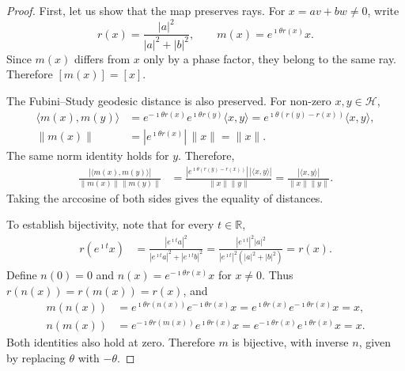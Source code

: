 \documentclass{techbrief}
\begin{document}
\begin{proof}
	First, let us show that the map preserves rays. For $x=av+bw\neq0$, write
	\begin{equation*}
		r(x)=\frac{|a|^2}{|a|^2+|b|^2},
		\qquad
		m(x)=e^{\imath\theta r(x)}x.
	\end{equation*}
	Since $m(x)$ differs from $x$ only by a phase factor, they belong to the same ray. Therefore $[m(x)]=[x]$.
	
	The Fubini--Study geodesic distance is also preserved. For non-zero $x,y\in\mathcal{H}$,
	\begin{equation*}
		\begin{aligned}
			\langle m(x),m(y)\rangle
			&=e^{-\imath\theta r(x)}e^{\imath\theta r(y)}
			\langle x,y\rangle
			=e^{\imath\theta(r(y)-r(x))}\langle x,y\rangle,\\
			\|m(x)\|
			&=|e^{\imath\theta r(x)}|\,\|x\|=\|x\|.
		\end{aligned}
	\end{equation*}
	The same norm identity holds for $y$. Therefore,
	\begin{equation*}
		\begin{aligned}
			\frac{|\langle m(x),m(y)\rangle|}
			{\|m(x)\|\|m(y)\|}
			&=\frac{|e^{\imath\theta(r(y)-r(x))}|\,
				|\langle x,y\rangle|}
			{\|x\|\|y\|} =\frac{|\langle x,y\rangle|}{\|x\|\|y\|}.
		\end{aligned}
	\end{equation*}
	Taking the arccosine of both sides gives the equality of distances.
	
	To establish bijectivity, note that for every $t\in\mathbb{R}$,
	\begin{equation*}
		\begin{aligned}
			r(e^{\imath t}x)
			&=\frac{|e^{\imath t}a|^2}
			{|e^{\imath t}a|^2+|e^{\imath t}b|^2} =\frac{|e^{\imath t}|^2|a|^2}
			{|e^{\imath t}|^2(|a|^2+|b|^2)}
			=r(x).
		\end{aligned}
	\end{equation*}
	Define $n(0)=0$ and $n(x)=e^{-\imath\theta r(x)}x$ for $x\neq0$. Thus $r(n(x))=r(m(x))=r(x)$, and
	\begin{equation*}
		\begin{aligned}
			m(n(x))
			&=e^{\imath\theta r(n(x))}
			e^{-\imath\theta r(x)}x
			=e^{\imath\theta r(x)}
			e^{-\imath\theta r(x)}x=x,\\
			n(m(x))
			&=e^{-\imath\theta r(m(x))}
			e^{\imath\theta r(x)}x
			=e^{-\imath\theta r(x)}
			e^{\imath\theta r(x)}x=x.
		\end{aligned}
	\end{equation*}
	Both identities also hold at zero. Therefore $m$ is bijective, with inverse $n$, given by replacing $\theta$ with $-\theta$.
	

\end{proof}
\end{document}
